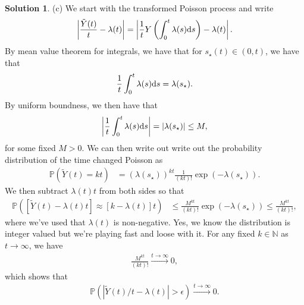 \documentclass[12pt]{article}
\newcommand{\bbN}{\mathbb{N}}
\newcommand{\Prob}{\mathbb{P}}
\newcommand{\abs}[1]{ \left| #1 \right| }
\theoremstyle{definition}
\newtheorem{sol}{Solution}
\theoremstyle{remark}
\def\d{{\rm d}}
\begin{document}
\begin{sol}
    (c) We start with the transformed Poisson process and write
     \begin{align*}
         \abs{ \frac{\tilde{Y}(t)}{t} - \lambda(t) } = \abs{  \frac{1}{t} Y\left(  \int_{0}^{t} \lambda(s) \d s  \right) - \lambda(t)}.
    \end{align*}
By mean value theorem for integrals, we have that for $s_{\star}(t) \in (0,t)$, we have that
\begin{align*}
    \frac{1}{t} \int_{0}^{t} \lambda(s) \d s = \lambda(s_{\star}).
\end{align*}
By uniform boundness, we then have that
\begin{align*}
    \abs{\frac{1}{t} \int_{0}^{t}\lambda(s) \d s} = \abs{\lambda(s_{\star})}\leq M,
\end{align*}
for some fixed $M > 0$. We can then write out write out the probability distribution of the time changed Poisson as
\begin{align*}
    \Prob(\tilde{Y}(t)  = kt) &= \left( \lambda(s_{\star})\right)^{kt} \frac{1}{(kt)!} \exp(-\lambda(s_{\star})).
\end{align*}
We then subtract $\lambda(t)t$ from both sides so that
\begin{align*}
    \Prob([\tilde{Y}(t) - \lambda(t)t] \approx [k-\lambda(t)]t) &\leq \frac{ M^{kt}  }{(kt)!} \exp(-\lambda(s_{\star})) \leq  \frac{ M^{kt}  }{(kt)!},
\end{align*}
where we've used that $\lambda(t)$ is non-negative. Yes, we know the distribution is integer valued but we're playing fast and loose with it. For any fixed $k\in\bbN$ as $t\to \infty$, we have
\begin{align*}
    \frac{M^{kt}}{(kt)!} \xrightarrow{t \to \infty} 0,
\end{align*}
which shows that 
\begin{align*}
    \Prob \left( \abs{ \tilde{Y}(t) / t - \lambda(t) } > \epsilon \right) \xrightarrow{t \to \infty} 0.
\end{align*}


\end{sol}
\end{document}
